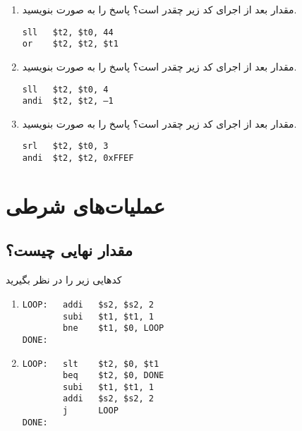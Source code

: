\documentclass[11pt, dvipsnames, svgnames, x11names]{article}
\begin{document}
\begin{enumerate}
\item 
مقدار  بعد از اجرای کد زیر چقدر است؟ پاسخ را به صورت  بنویسید.

\begin{latin}
\begin{lstlisting}
sll   $t2, $t0, 44
or    $t2, $t2, $t1
\end{lstlisting}
\end{latin}
\item 
مقدار  بعد از اجرای کد زیر چقدر است؟ پاسخ را به صورت  بنویسید.

\begin{latin}
\begin{lstlisting}[keywords={sll, andi}]
sll   $t2, $t0, 4
andi  $t2, $t2, –1
\end{lstlisting}
\end{latin}

\item 
مقدار  بعد از اجرای کد زیر چقدر است؟ پاسخ را به صورت  بنویسید.

\begin{latin}
\begin{lstlisting}[keywords={srl, andi}]
srl   $t2, $t0, 3
andi  $t2, $t2, 0xFFEF
\end{lstlisting}
\end{latin}
\end{enumerate}

\section{عملیات‌های شرطی }
\subsection{مقدار نهایی چیست؟}
کد‌هایی زیر را در نظر بگیرید
\begin{latin}
\begin{enumerate}
\item
\begin{lstlisting}[keywords={addi, subi, bne}]
LOOP:   addi   $s2, $s2, 2
        subi   $t1, $t1, 1
        bne    $t1, $0, LOOP
DONE:
\end{lstlisting}

\item
\begin{lstlisting}[keywords={slt, beq, subi, addi, j}]
LOOP:   slt    $t2, $0, $t1
        beq    $t2, $0, DONE
        subi   $t1, $t1, 1
        addi   $s2, $s2, 2
        j      LOOP
DONE:
\end{lstlisting}
\end{enumerate}
\end{latin}
\end{document}

